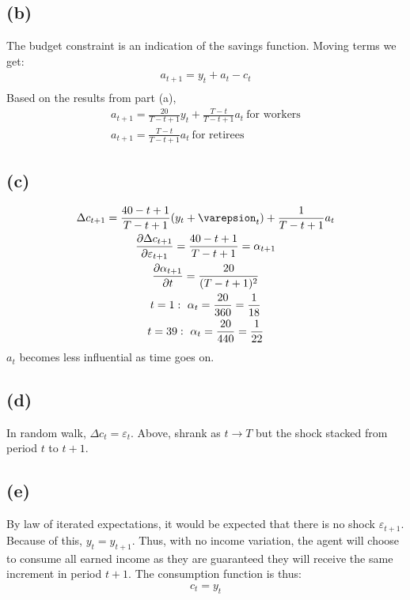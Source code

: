 \documentclass[10pt,a4paper]{article}
\begin{document}
    \subsection*{(b)}
      The budget constraint is an indication of the savings function. Moving terms we get:
      \begin{gather*}
        a_{t+1} = y_t + a_t - c_t \\
      \end{gather*}
      Based on the results from part (a),
      \begin{gather*}
        a_{t+1} = \frac{20}{T-t+1}y_t + \frac{T-t}{T-t+1}a_t \ \text{for workers} \\
        a_{t+1} = \frac{T-t}{T-t+1}a_{t} \ \text{for retirees}
      \end{gather*}
    \subsection*{(c)}
      \begin{gather*}
        \Delta c_{t+1} = \frac{40-t+1}{T-t+1}(y_t+\varepsion_t) + \frac{1}{T-t+1}a_{t} \\
        \frac{\partial\Delta c_{t+1}}{\partial\varepsilon_{t+1}} = \frac{40-t+1}{T-t+1} = \alpha_{t+1} \\
        \frac{\partial\alpha_{t+1}}{\partial t} = \frac{20}{(T-t+1)^2} \\
        t = 1: \ \alpha_t = \frac{20}{360} = \frac{1}{18} \\
        t = 39: \ \alpha_t = \frac{20}{440} = \frac{1}{22} \\
      \end{gather*}
      $a_t$ becomes less influential as time goes on. 
    \subsection*{(d)}
      In random walk, $\Delta c_t = \varepsilon_t$. Above, \alpha shrank as $t \rightarrow T$ but the shock stacked from period $t$ to $t+1$.
    \subsection*{(e)}
      By law of iterated expectations, it would be expected that there is no shock $\varepsilon_{t+1}$. Because of this, $y_t = y_{t+1}$. Thus, with no income variation, the agent will choose to consume all earned income as they are guaranteed they will receive the same increment in period $t+1$. The consumption function is thus:
      \begin{gather*}
        c_t = y_t
      \end{gather*}
\end{document}
